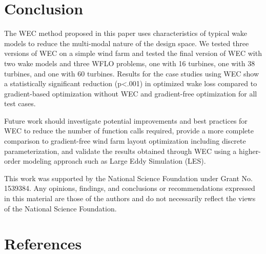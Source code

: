 \documentclass[a4paper]{jpconf}
\begin{document}
\section{Conclusion}
The WEC method proposed in this paper uses characteristics of typical wake models to reduce the multi-modal nature of the design space. We tested three versions of WEC on a simple wind farm and tested the final version of WEC with two wake models and three WFLO problems, one with 16 turbines, one with 38 turbines, and one with 60 turbines. Results for the case studies using WEC show a statistically significant reduction  (p<.001) in optimized wake loss compared to gradient-based optimization without WEC and gradient-free optimization for all test cases.

Future work should investigate potential improvements and best practices for WEC to reduce the number of function calls required, provide a more complete comparison to gradient-free wind farm layout optimization including discrete parameterization, and validate the results obtained through WEC using a higher-order modeling approach such as Large Eddy Simulation (LES).

\ack 
This work was supported by the National Science Foundation under Grant No. 1539384. Any opinions, findings, and conclusions or recommendations expressed in this material are those of the authors and do not necessarily reflect the views of the National Science Foundation.

\section*{References}


\end{document}
